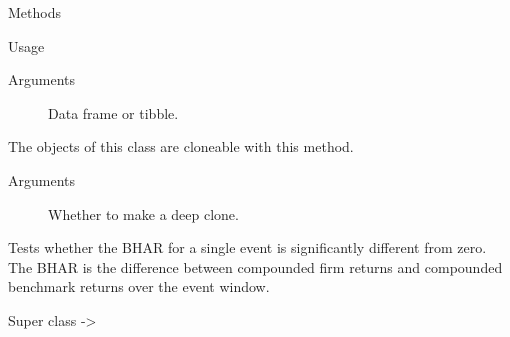 \documentclass[a4paper]{book}
\begin{document}
\begin{Section}{Methods}
\begin{SubSection}{}
\begin{SubSubSection}{Usage}
\end{SubSubSection}

%
\begin{SubSubSection}{Arguments}

\begin{description}

\item[] Data frame or tibble.

\end{description}



\end{SubSubSection}

\end{SubSection}




\hypertarget{method-BHARModel-clone}{}
%
\begin{SubSection}{}
The objects of this class are cloneable with this method.
%

%
\begin{SubSubSection}{Arguments}

\begin{description}

\item[] Whether to make a deep clone.

\end{description}



\end{SubSubSection}

\end{SubSection}


\end{Section}
%
\begin{Description}
Tests whether the BHAR for a single event is significantly different from
zero. The BHAR is the difference between compounded firm returns and
compounded benchmark returns over the event window.
\end{Description}
%
\begin{Section}{Super class}
 -> 
\end{Section}
\end{document}
